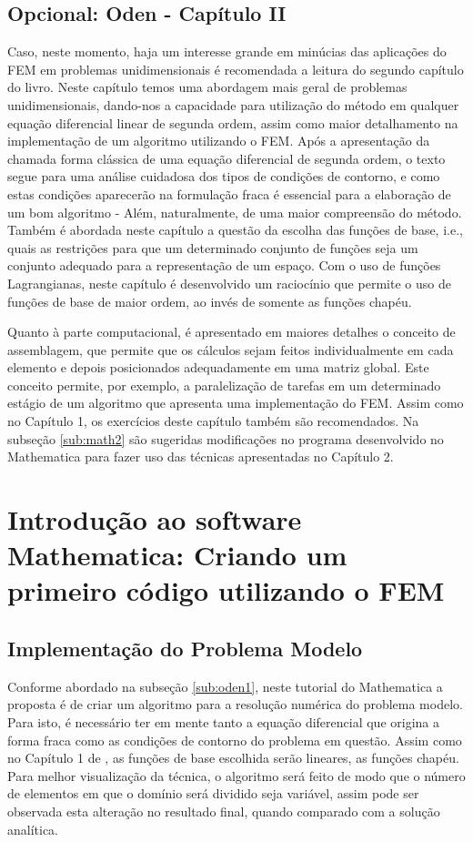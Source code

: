 \documentclass[11pt, oneside, hidelinks]{article}   	%
\begin{document}
\subsection{Opcional: Oden - Capítulo II}
\label{sub:oden2}
Caso, neste momento, haja um interesse grande em minúcias das aplicações do FEM em problemas unidimensionais é recomendada a leitura do segundo capítulo do livro. Neste capítulo temos uma abordagem mais geral de problemas unidimensionais, dando-nos a capacidade para utilização do método em qualquer equação diferencial linear de segunda ordem, assim como maior detalhamento na implementação de um algoritmo utilizando o FEM. Após a apresentação da chamada forma clássica de uma equação diferencial de segunda ordem, o texto segue para uma análise cuidadosa dos tipos de condições de contorno, e como estas condições aparecerão na formulação fraca é essencial para a elaboração de um bom algoritmo - Além, naturalmente, de uma maior compreensão do método. Também é abordada neste capítulo a questão da escolha das funções de base, i.e., quais as restrições para que um determinado conjunto de funções seja um conjunto adequado para a representação de um espaço. Com o uso de funções Lagrangianas, neste capítulo é desenvolvido um raciocínio que permite o uso de funções de base de maior ordem, ao invés de somente as funções chapéu.

Quanto à parte computacional, é apresentado em maiores detalhes o conceito de assemblagem, que permite que os cálculos sejam feitos individualmente em cada elemento e depois posicionados adequadamente em uma matriz global. Este conceito permite, por exemplo, a paralelização de tarefas em um determinado estágio de um algoritmo que apresenta uma implementação do FEM. Assim como no Capítulo 1, os exercícios deste capítulo também são recomendados. Na subseção \ref{sub:math2} são sugeridas modificações no programa desenvolvido no Mathematica para fazer uso das técnicas apresentadas no Capítulo 2.
\newpage

\section{Introdução ao software Mathematica: Criando um primeiro código utilizando o FEM}
\label{sec:math}
\subsection*{Implementação do Problema Modelo}
Conforme abordado na subseção \ref{sub:oden1}, neste tutorial do Mathematica a proposta é de criar um algoritmo para a resolução numérica do problema modelo. Para isto, é necessário ter em mente tanto a equação diferencial que origina a forma fraca como as condições de contorno do problema em questão. Assim como no Capítulo 1 de \citet{oden81}, as funções de base escolhida serão lineares, as funções chapéu. Para melhor visualização da técnica, o algoritmo será feito de modo que o número de elementos em que o domínio será dividido seja variável, assim pode ser observada esta alteração no resultado final, quando comparado com a solução analítica.
\end{document}
